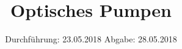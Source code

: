 

\subject{V21}
\title{Optisches Pumpen}
\date{
  Durchführung: 23.05.2018
  \hspace{3em}
  Abgabe: 28.05.2018
}



\maketitle
\newpage

%

%

%



\printbibliography


